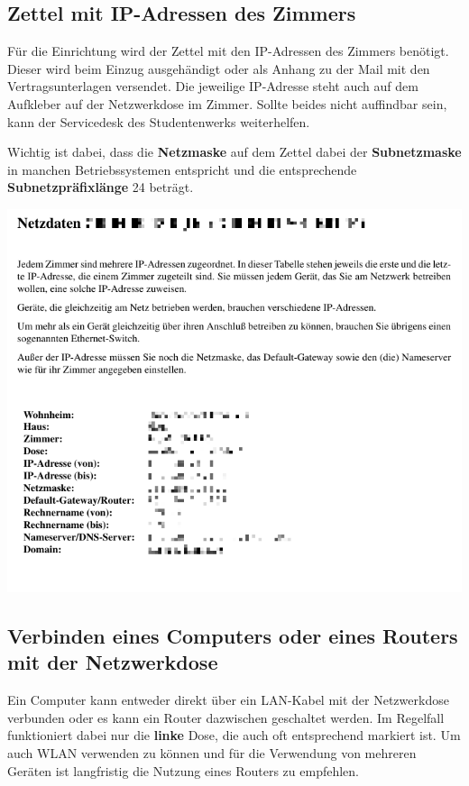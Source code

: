 \documentclass[a4paper,12pt]{scrartcl}
\begin{document}
\subsection{Zettel mit IP-Adressen des Zimmers}
\label{ip_sheet}
\begin{minipage}{0.57\textwidth}
Für die Einrichtung wird der Zettel mit den IP-Adressen des Zimmers benötigt.
Dieser wird beim Einzug ausgehändigt oder als Anhang zu der Mail mit den Vertragsunterlagen versendet.
Die jeweilige IP-Adresse steht auch auf dem Aufkleber auf der Netzwerkdose im Zimmer.
Sollte beides nicht auffindbar sein, kann der Servicedesk des Studentenwerks weiterhelfen.

Wichtig ist dabei, dass die \textbf{Netzmaske} auf dem Zettel dabei der \textbf{Subnetzmaske} in manchen Betriebssystemen entspricht und die entsprechende \textbf{Subnetzpräfixlänge} 24 beträgt.
\end{minipage}
\hfill
\begin{minipage}{0.4\textwidth}
\includegraphics[width=\linewidth]{Bilder/ip_zettel}
\end{minipage}

\subsection{Verbinden eines Computers oder eines Routers mit der Netzwerkdose}
Ein Computer kann entweder direkt über ein LAN-Kabel mit der Netzwerkdose verbunden oder es kann ein Router dazwischen geschaltet werden.
Im Regelfall funktioniert dabei nur die \textbf{linke} Dose, die auch oft entsprechend markiert ist. 
Um auch WLAN verwenden zu können und für die Verwendung von mehreren Geräten ist langfristig die Nutzung eines Routers zu empfehlen.
\end{document}
